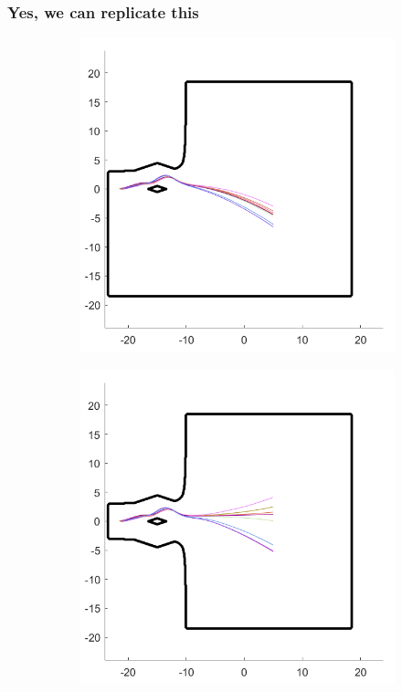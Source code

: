 \documentclass[compress,10pt,usenames,dvipsnames]{beamer}
\theoremstyle{remark}
\begin{document}
\begin{frame}\frametitle{Yes, we can replicate this}
	\begin{figure}
		\begin{subfigure}[t]{.5\textwidth}
			\centering
			\includegraphics[scale=0.35]{Figures/fig1_nowall.png}
			
		\end{subfigure}%
		\begin{subfigure}[t]{.5\textwidth}
			\centering
			\includegraphics[scale=0.35]{Figures/fig1_yeswall.png}
		\end{subfigure}
	\end{figure}
\end{frame}
\end{document}
